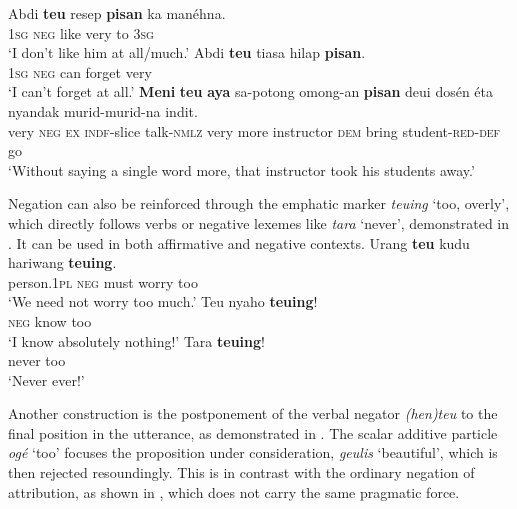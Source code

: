 \documentclass[output=paper]{langscibook}
\begin{document}
\ea\label{ex:sun:54}
    \ea\label{ex:sun:54a}
        \gll  Abdi \textbf{teu} resep \textbf{pisan} ka manéhna. \\ 
              1\textsc{sg} \textsc{neg} like very to 3\textsc{sg} \\
        \glt ‘I don’t like him at all/much.’
    \ex\label{ex:sun:54b}
        \gll  Abdi \textbf{teu} tiasa hilap \textbf{pisan}.\\
              1\textsc{sg} \textsc{neg} can forget very\\
        \glt ‘I can’t forget at all.’
    \ex\label{ex:sun:54c}
        \gll  \textbf{Meni} \textbf{teu} \textbf{aya} sa-potong omong-an \textbf{pisan} deui dosén éta nyandak murid-murid-na indit. \\
              very \textsc{neg} \textsc{ex} \textsc{indf}{}-slice talk-\textsc{nmlz} very more instructor \textsc{dem} bring student-\textsc{red}-\textsc{def} go \\
        \glt ‘Without saying a single word more, that instructor took his students away.’
    \z
\z 

Negation can also be reinforced through the emphatic marker \textit{teuing} ‘too, overly’, which directly follows verbs or negative lexemes like \textit{tara} ‘never’, demonstrated in . It can be used in both affirmative and negative contexts. 
\ea\label{ex:sun:55}
    \ea\label{ex:sun:55a}
        \gll  Urang \textbf{teu} kudu hariwang \textbf{teuing}.\\ 
              person.1\textsc{pl} \textsc{neg} must worry too\\
        \glt ‘We need not worry too much.’
    \ex\label{ex:sun:55b}
        \gll  Teu nyaho \textbf{teuing}!\\
              \textsc{neg} know too \\
        \glt ‘I know absolutely nothing!’
    \ex\label{ex:sun:55c}
        \gll  Tara \textbf{teuing}!\\
              never too\\
        \glt ‘Never ever!’
    \z
\z 

Another construction is the postponement of the verbal negator \textit{(hen)teu} to the final position in the utterance, as demonstrated in . The scalar additive particle \textit{ogé} ‘too’ focuses the proposition under consideration, \textit{geulis} ‘beautiful’, which is then rejected resoundingly. This is in contrast with the ordinary negation of attribution, as shown in , which does not carry the same pragmatic force.
\end{document}
